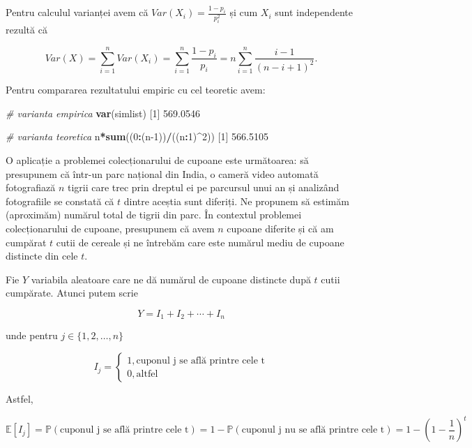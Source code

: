 \documentclass[]{article}
\newenvironment{Shaded}{\begin{snugshade}}{\end{snugshade}}
\newcommand{\CommentTok}[1]{\textcolor[rgb]{0.56,0.35,0.01}{\textit{#1}}}
\newcommand{\DecValTok}[1]{\textcolor[rgb]{0.00,0.00,0.81}{#1}}
\newcommand{\FloatTok}[1]{\textcolor[rgb]{0.00,0.00,0.81}{#1}}
\newcommand{\KeywordTok}[1]{\textcolor[rgb]{0.13,0.29,0.53}{\textbf{#1}}}
\newcommand{\NormalTok}[1]{#1}
\newcommand{\OperatorTok}[1]{\textcolor[rgb]{0.81,0.36,0.00}{\textbf{#1}}}
\begin{document}
Pentru calculul varianței avem că \(Var(X_i) = \frac{1-p_i}{p_i^2}\) și
cum \(X_i\) sunt independente rezultă că

\[
  Var(X) = \sum_{i = 1}^{n}Var(X_i) = \sum_{i = 1}^{n}\frac{1-p_i}{p_i} = n\sum_{i = 1}^{n}\frac{i-1}{(n-i+1)^2}.
\]

Pentru compararea rezultatului empiric cu cel teoretic avem:

\begin{Shaded}
\begin{Highlighting}[]
\CommentTok{# varianta empirica}
\KeywordTok{var}\NormalTok{(simlist)}
\NormalTok{[}\DecValTok{1}\NormalTok{] }\FloatTok{569.0546}

\CommentTok{# varianta teoretica}
\NormalTok{n}\OperatorTok{*}\KeywordTok{sum}\NormalTok{((}\DecValTok{0}\OperatorTok{:}\NormalTok{(n}\DecValTok{-1}\NormalTok{))}\OperatorTok{/}\NormalTok{((n}\OperatorTok{:}\DecValTok{1}\NormalTok{)}\OperatorTok{^}\DecValTok{2}\NormalTok{))}
\NormalTok{[}\DecValTok{1}\NormalTok{] }\FloatTok{566.5105}
\end{Highlighting}
\end{Shaded}

O aplicație a problemei colecționarului de cupoane este următoarea: să
presupunem că într-un parc național din India, o cameră video automată
fotografiază \(n\) tigrii care trec prin dreptul ei pe parcursul unui an
și analizând fotografiile se constată că \(t\) dintre aceștia sunt
diferiți. Ne propunem să estimăm (aproximăm) numărul total de tigrii din
parc. În contextul problemei colecționarului de cupoane, presupunem că
avem \(n\) cupoane diferite și că am cumpărat \(t\) cutii de cereale și
ne întrebăm care este numărul mediu de cupoane distincte din cele \(t\).

Fie \(Y\) variabila aleatoare care ne dă numărul de cupoane distincte
după \(t\) cutii cumpărate. Atunci putem scrie

\[
  Y = I_1 + I_2 +\cdots+I_n
\]

unde pentru \(j \in\{1,2,\ldots,n\}\)

\[
  I_j = \left\{\begin{array}{ll}
          1, \text{cuponul j se află printre cele t}\\
          0, \text{altfel}
  \end{array}\right.
\]

Astfel,

\[
  \mathbb{E}[I_j] = \mathbb{P}(\text{cuponul j se află printre cele t}) = 1 - \mathbb{P}(\text{cuponul j nu se află printre cele t}) = 1 - \left(1 - \frac{1}{n}\right)^t
\]
\end{document}
